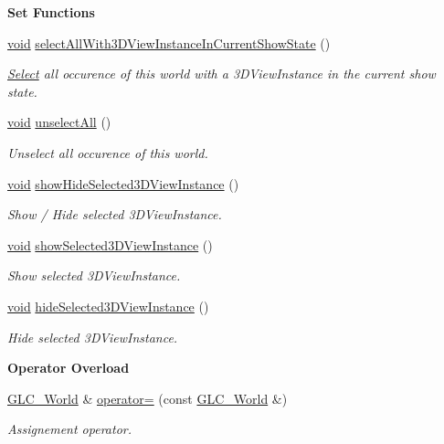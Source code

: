\begin{Indent}{\bf Set Functions}
\begin{DoxyCompactItemize}
\hyperlink{group___u_a_v_objects_plugin_ga444cf2ff3f0ecbe028adce838d373f5c}{void} \hyperlink{class_g_l_c___world_a2b57e567a407f7b2dd47a576b47ca1be}{select\-All\-With3\-D\-View\-Instance\-In\-Current\-Show\-State} ()
\begin{DoxyCompactList}\small\item\em \hyperlink{class_select}{Select} all occurence of this world with a 3\-D\-View\-Instance in the current show state. \end{DoxyCompactList}\item 
\hyperlink{group___u_a_v_objects_plugin_ga444cf2ff3f0ecbe028adce838d373f5c}{void} \hyperlink{class_g_l_c___world_a4d30ffd4cf9cdcba3d076d8466032d42}{unselect\-All} ()
\begin{DoxyCompactList}\small\item\em Unselect all occurence of this world. \end{DoxyCompactList}\item 
\hyperlink{group___u_a_v_objects_plugin_ga444cf2ff3f0ecbe028adce838d373f5c}{void} \hyperlink{class_g_l_c___world_a088596fb282c34265f9c23f0b9c50901}{show\-Hide\-Selected3\-D\-View\-Instance} ()
\begin{DoxyCompactList}\small\item\em Show / Hide selected 3\-D\-View\-Instance. \end{DoxyCompactList}\item 
\hyperlink{group___u_a_v_objects_plugin_ga444cf2ff3f0ecbe028adce838d373f5c}{void} \hyperlink{class_g_l_c___world_aaf5409db6eda90fef81cd5b5ec8c1d14}{show\-Selected3\-D\-View\-Instance} ()
\begin{DoxyCompactList}\small\item\em Show selected 3\-D\-View\-Instance. \end{DoxyCompactList}\item 
\hyperlink{group___u_a_v_objects_plugin_ga444cf2ff3f0ecbe028adce838d373f5c}{void} \hyperlink{class_g_l_c___world_ad9e60421a1a55c1973c5f19bce11d773}{hide\-Selected3\-D\-View\-Instance} ()
\begin{DoxyCompactList}\small\item\em Hide selected 3\-D\-View\-Instance. \end{DoxyCompactList}\end{DoxyCompactItemize}
\end{Indent}
\begin{Indent}{\bf Operator Overload}\par
\begin{DoxyCompactItemize}
\item 
\hyperlink{class_g_l_c___world}{G\-L\-C\-\_\-\-World} \& \hyperlink{class_g_l_c___world_aeddeb3a4054e9a95bfe6c951e18e1e72}{operator=} (const \hyperlink{class_g_l_c___world}{G\-L\-C\-\_\-\-World} \&)
\begin{DoxyCompactList}\small\item\em Assignement operator. \end{DoxyCompactList}\end{DoxyCompactItemize}
\end{Indent}
